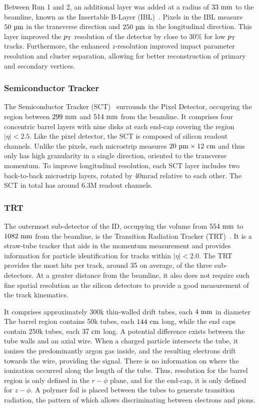 Between Run 1 and 2, an additional layer was added at a radius of $33~\mm$ to the beamline, known as the Insertable B-Layer (IBL)~\cite{ATLASIBL}.
Pixels in the IBL measure $50~\um$ in the transverse direction and $250~\um$ in the longitudinal direction.
This layer improved the $p_\mathrm{T}$ resolution of the detector by close to 30\% for low $p_\mathrm{T}$ tracks.
Furthermore, the enhanced $z$-resolution improved impact parameter resolution and cluster separation, allowing for better reconstruction of primary and secondary vertices.

\subsubsection{Semiconductor Tracker}

The Semiconductor Tracker (SCT)~\cite{ATLASSCT} surrounds the Pixel Detector, occupying the region between $299~\mm$ and $514~\mm$ from the beamline.
It comprises four concentric barrel layers with nine disks at each end-cap covering the region $|\eta| < 2.5$.
Like the pixel detector, the SCT is composed of silicon readout channels. Unlike the pixels, each microstrip measures $20~\um \times 12~\cm$ and thus only has high granularity in a single direction, oriented to the transverse momentum.
To improve longitudinal resolution, each SCT layer includes two back-to-back microstrip layers, rotated by $40 \unit{\milli\radian}$ relative to each other.
The SCT in total has around 6.3M readout channels.

\subsubsection{TRT}

The outermost sub-detector of the ID, occupying the volume from $554~\mm$ to $1082~\mm$ from the beamline, is the Transition Radiation Tracker (TRT)~\cite{ATLASTRT}.
It is a straw-tube tracker that aids in the momentum measurement and provides information for particle identification for tracks within $|\eta| < 2.0$.
The TRT provides the most hits per track, around 35 on average, of the three sub-detectors.
At a greater distance from the beamline, it also does not require such fine spatial resolution as the silicon detectors to provide a good measurement of the track kinematics.

It comprises approximately 300k thin-walled drift tubes, each $4~\mm$ in diameter
The barrel region contains 50k tubes, each $144~\cm$ long, while the end caps contain 250k tubes, each $37~\cm$ long.
A potential difference exists between the tube walls and an axial wire.
When a charged particle intersects the tube, it ionizes the predominantly argon gas inside, and the resulting electrons drift towards the wire, providing the signal.
There is no information on where the ionization occurred along the length of the tube.
Thus, resolution for the barrel region is only defined in the $r-\phi$ plane, and for the end-cap, it is only defined for $z-\phi$.
A polymer foil is placed between the tubes to generate transition radiation, the pattern of which allows discriminating between electrons and pions.

